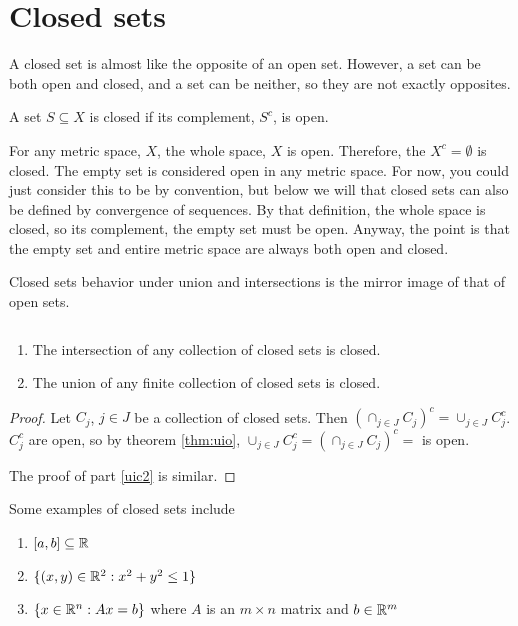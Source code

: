 \section{Closed sets}

A closed set is almost like the opposite of an open set.  However, a
set can be both open and closed, and a set can be neither, so they are
not exactly opposites.
\begin{definition}
  A set $S \subseteq X$ is closed if its complement, $S^c$, is open. 
\end{definition}
For any metric space, $X$, the whole space, $X$ is open. Therefore,
the $X^c = \emptyset$ is closed.  The empty set is considered open in
any metric space. For now, you could just consider this to be by
convention, but below we will that closed sets can also be defined by
convergence of sequences. By that definition, the whole space is
closed, so its complement, the empty set must be open. Anyway, the
point is that the empty set and entire metric space are always both
open and closed.

Closed sets behavior under union and intersections is the mirror image
of that of open sets. 
\begin{theorem} $\;$\label{thm:uic}
  \begin{enumerate}
  \item The intersection of any collection of closed sets is closed.
  \item\label{uic2} The union of any finite collection of closed sets is closed. 
  \end{enumerate}
\end{theorem}
\begin{proof}
  Let $C_j$, $j\in J$ be a collection of closed sets. Then 
  $ \left(\cap_{j \in J} C_j\right)^c = \cup_{j \in J}
  C^c_j $. 
  $C^c_j$ are open, so by theorem \ref{thm:uio},  $\cup_{j \in J}
  C^c_j = \left(\cap_{j \in J} C_j\right)^c =$ is open.  
  
  The proof of part \ref{uic2} is similar. 
\end{proof}

\begin{example}
  Some examples of closed sets include
  \begin{enumerate}
  \item $[a,b] \subseteq \mathbb{R}$
  \item $\{(x,y) \in \mathbb{R}^2: x^2 + y^2 \leq 1\}$
  \item $\{x \in \mathbb{R}^n: A x = b \}$ where $A$ is an $m \times n$ matrix
    and $b \in \mathbb{R}^m$
  \end{enumerate}
\end{example}

